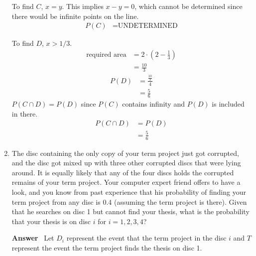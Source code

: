 \documentclass[paper=usletter, fontsize=12pt]{article}
\newcommand{\ans}{\textbf{Answer} \ }
\begin{document}
\begin{enumerate}
            To find $C$, $x = y$. This implies $x - y = 0$, which cannot be
            determined since there would be infinite points on the line.
            \begin{align*}
                P(C) & = \text{UNDETERMINED}
            \end{align*}

            To find $D$, $x > 1/3$.
            \begin{align*}
                \text{required area} & = 2 \cdot (2 - \frac{1}{3}) \\
                & = \frac{10}{3}
            \end{align*}
            \begin{align*}
                P(D) & = \frac{\frac{10}{3}}{4} \\
                & = \frac{5}{6}
            \end{align*}
            $P(C \cap D) = P(D)$ since $P(C)$ contains infinity and $P(D)$ is
            included in there.
            \begin{align*}
                P(C \cap D) & = P(D) \\
                & = \frac{5}{6}
            \end{align*}

        \item The disc containing the only copy of your term project just got
        corrupted, and the disc got mixed up with three other corrupted discs
        that were lying around. It is equally likely that any of the four discs
        holds the corrupted remains of your term project. Your computer expert
        friend offers to have a look, and you know from past experience that
        his probability of finding your term project from any disc is 0.4
        (assuming the term project is there). Given that he searches on disc 1
        but cannot find your thesis, what is the probability that your thesis
        is on disc $i$ for $i = 1, 2, 3, 4$?

        \ans Let $D_i$ represent the event that the term project in the disc
        $i$ and $T$ represent the event the term project finds the thesis on
        disc 1.


\end{enumerate}
\end{document}
